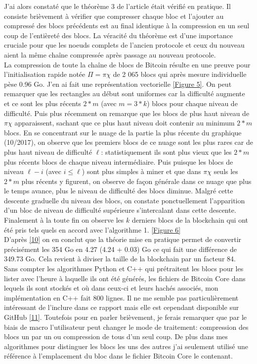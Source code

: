 \documentclass[12pt,a4paper]{article}
\newcommand{\source}[1]{\hyperlink{#1}{[#1]}}
\newcommand{\annexe}[2]{\hyperlink{#1}{[Figure #2]}}
\begin{document}
	J'ai alors constaté que le théorème 3 de l'article était vérifié en pratique. Il consiste brièvement à vérifier que compresser chaque bloc et l'ajouter au compressé des blocs précédents est au final identique à la compression en un seul coup de l'entièreté des blocs. La véracité du théorème est d'une importance cruciale pour que les noeuds complets de l'ancien protocole et ceux du nouveau aient la même chaîne compressée après passage au nouveau protocole.\\
	
	La compression de toute la chaîne de blocs de Bitcoin résulte en une preuve pour l'initialisation rapide notée $\Pi = \pi\chi$ de 2 065 blocs qui après mesure individuelle pèse 0.96 Go. J'en ai fait une représentation vectorielle \annexe{25}{5}. On peut remarquer que les rectangles au début sont uniformes car la difficulté augmente et ce sont les plus récents $2*m$ (avec $m = 3*k$) blocs pour chaque niveau de difficulté. Puis plus récemment on remarque que les blocs de plus haut niveau de $\pi\chi$ apparaissent, sachant que ce plus haut niveau doit contenir au minimum $2*m$ blocs. En se concentrant sur le nuage de la partie la plus récente du graphique (10/2017), on observe que les premiers blocs de ce nuage sont les plus rares car de plus haut niveau de difficulté $\ell$: statistiquement ils sont plus vieux que les $2*m$ plus récents blocs de chaque niveau intermédiaire. Puis puisque les blocs de niveau $\ell - i$ (avec $i \leq \ell$) sont plus simples à miner et que dans $\pi\chi$ seuls les $2*m$ plus récents y figurent, on observe de façon générale dans ce nuage que plus le temps avance, plus le niveau de difficulté des blocs diminue. Malgré cette descente graduelle du niveau des blocs, on constate ponctuellement l'apparition d'un bloc de niveau de difficulté supérieure s'intercalant dans cette descente. Finalement à la toute fin on observe les $k$ derniers blocs de la blockchain qui ont été pris tels quels en accord avec l'algorithme 1. \annexe{26}{6}\\ %
D'après \source{10} on en conclut que la théorie mise en pratique permet de convertir précisément les 354 Go en 4.27 (4.24 + 0.03) Go ce qui fait une différence de 349.73 Go. Cela revient à diviser la taille de la blockchain par un facteur 84.\\
	
	Sans compter les algorithmes Python et C++ qui prétraitent les blocs pour les lister avec l'heure à laquelle ils ont été générés, les fichiers de Bitcoin Core dans lequels ils sont stockés et où dans ceux-ci et leurs hachés associés, mon implémentation en C++ fait 800 lignes. Il ne me semble pas particulièrement intéressant de l'inclure dans ce rapport mais elle est cependant disponible sur GitHub \source{11}. Toutefois pour en parler brièvement, je ferais remarquer que par le biais de macro l'utilisateur peut changer le mode de traitement: compression des blocs un par un ou compression de tous d'un seul coup. De plus dans mes algorithmes pour distinguer les blocs les uns des autres j'ai seulement utilisé une référence à l'emplacement du bloc dans le fichier Bitcoin Core le contenant. %
	
\end{document}
